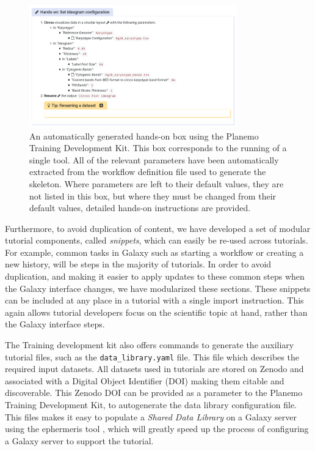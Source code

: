 \documentclass[10pt,letterpaper]{article}
\begin{document}
\begin{figure}[!ht]
	\centering
	\includegraphics[width=0.8\textwidth]{images/tool-in-tutorial.png}
	\caption{An automatically generated hands-on box using the Planemo Training Development Kit. This box corresponds to the running of a single tool. All of the relevant parameters have been automatically extracted from the workflow definition file used to generate the skeleton. Where parameters are left to their default values, they are not listed in this box, but where they must be changed from their default values, detailed hands-on instructions are provided.\label{fig:planemo}}
\end{figure}


Furthermore, to avoid duplication of content, we have developed a set of modular tutorial components, called \emph{snippets}, which can easily be re-used across tutorials.
For example, common tasks in Galaxy such as starting a workflow or creating a new history, will be steps in the majority of tutorials. In order to avoid duplication, and making it easier to apply updates to these common steps when the Galaxy interface changes, we have modularized these sections.
These snippets can be included at any place in a tutorial with a single import instruction.
This again allows tutorial developers focus on the scientific topic at hand, rather than the Galaxy interface steps.


The Training development kit also offers commands to generate the auxiliary tutorial files, such as the \verb+data_library.yaml+ file.
This file which describes the required input datasets. All datasets used in tutorials are stored on Zenodo and associated with a Digital Object Identifier (DOI) making them citable and discoverable.
This Zenodo DOI can be provided as a parameter to the Planemo Training Development Kit, to autogenerate the data library configuration file.
This files makes it easy to populate a \emph{Shared Data Library} on a Galaxy server using the ephermeris tool \cite{TODO}, which will greatly speed up the process of configuring a Galaxy server to support the tutorial.
\end{document}
